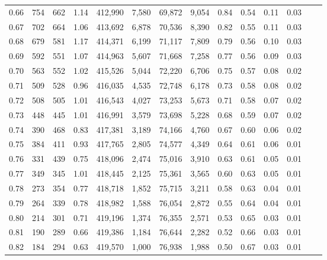 \begin{tabular}{rrrrrrrrrrrrrr}
0.66 &     754 &    662 &    1.14 &  412,990 &    7,580 &  69,872 &   9,054 &  0.84 &  0.54 &  0.11 &      0.03 \\
0.67 &     702 &    664 &    1.06 &  413,692 &    6,878 &  70,536 &   8,390 &  0.82 &  0.55 &  0.11 &      0.03 \\
0.68 &     679 &    581 &    1.17 &  414,371 &    6,199 &  71,117 &   7,809 &  0.79 &  0.56 &  0.10 &      0.03 \\
0.69 &     592 &    551 &    1.07 &  414,963 &    5,607 &  71,668 &   7,258 &  0.77 &  0.56 &  0.09 &      0.03 \\
0.70 &     563 &    552 &    1.02 &  415,526 &    5,044 &  72,220 &   6,706 &  0.75 &  0.57 &  0.08 &      0.02 \\
0.71 &     509 &    528 &    0.96 &  416,035 &    4,535 &  72,748 &   6,178 &  0.73 &  0.58 &  0.08 &      0.02 \\
0.72 &     508 &    505 &    1.01 &  416,543 &    4,027 &  73,253 &   5,673 &  0.71 &  0.58 &  0.07 &      0.02 \\
0.73 &     448 &    445 &    1.01 &  416,991 &    3,579 &  73,698 &   5,228 &  0.68 &  0.59 &  0.07 &      0.02 \\
0.74 &     390 &    468 &    0.83 &  417,381 &    3,189 &  74,166 &   4,760 &  0.67 &  0.60 &  0.06 &      0.02 \\
0.75 &     384 &    411 &    0.93 &  417,765 &    2,805 &  74,577 &   4,349 &  0.64 &  0.61 &  0.06 &      0.01 \\
0.76 &     331 &    439 &    0.75 &  418,096 &    2,474 &  75,016 &   3,910 &  0.63 &  0.61 &  0.05 &      0.01 \\
0.77 &     349 &    345 &    1.01 &  418,445 &    2,125 &  75,361 &   3,565 &  0.60 &  0.63 &  0.05 &      0.01 \\
0.78 &     273 &    354 &    0.77 &  418,718 &    1,852 &  75,715 &   3,211 &  0.58 &  0.63 &  0.04 &      0.01 \\
0.79 &     264 &    339 &    0.78 &  418,982 &    1,588 &  76,054 &   2,872 &  0.55 &  0.64 &  0.04 &      0.01 \\
0.80 &     214 &    301 &    0.71 &  419,196 &    1,374 &  76,355 &   2,571 &  0.53 &  0.65 &  0.03 &      0.01 \\
0.81 &     190 &    289 &    0.66 &  419,386 &    1,184 &  76,644 &   2,282 &  0.52 &  0.66 &  0.03 &      0.01 \\
0.82 &     184 &    294 &    0.63 &  419,570 &    1,000 &  76,938 &   1,988 &  0.50 &  0.67 &  0.03 &      0.01 \\

\end{tabular}
